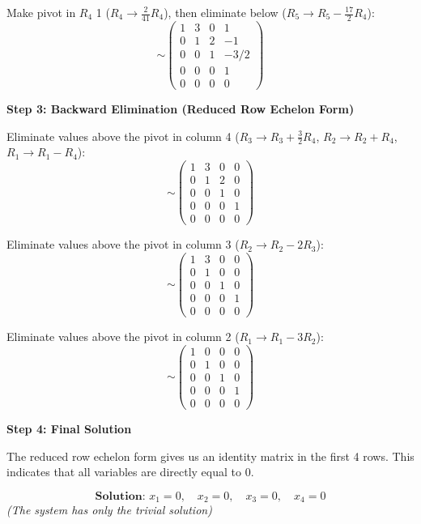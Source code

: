 \documentclass[12pt,a3paper]{article}
\begin{document}
\begin{tcolorbox}[enhanced,breakable,
  colback=cB!4,colframe=cB,boxrule=0.8pt,arc=5pt,
  title={\textbf{Answer --- Gauss-Jordan Elimination Method}},
  fonttitle=\bfseries\color{white},colbacktitle=cB]
Make pivot in $R_4$ 1 ($R_4 \to \frac{2}{41}R_4$), then eliminate below ($R_5 \to R_5 - \frac{17}{2}R_4$):
\[
\sim \begin{pmatrix}
1 & 3 & 0 & 1 \\
0 & 1 & 2 & -1 \\
0 & 0 & 1 & -3/2 \\
0 & 0 & 0 & 1 \\
0 & 0 & 0 & 0
\end{pmatrix}
\]

\medskip
\textbf{Step 3: Backward Elimination (Reduced Row Echelon Form)}

Eliminate values above the pivot in column 4 ($R_3 \to R_3 + \frac{3}{2}R_4$, $R_2 \to R_2 + R_4$, $R_1 \to R_1 - R_4$):
\[
\sim \begin{pmatrix}
1 & 3 & 0 & 0 \\
0 & 1 & 2 & 0 \\
0 & 0 & 1 & 0 \\
0 & 0 & 0 & 1 \\
0 & 0 & 0 & 0
\end{pmatrix}
\]

Eliminate values above the pivot in column 3 ($R_2 \to R_2 - 2R_3$):
\[
\sim \begin{pmatrix}
1 & 3 & 0 & 0 \\
0 & 1 & 0 & 0 \\
0 & 0 & 1 & 0 \\
0 & 0 & 0 & 1 \\
0 & 0 & 0 & 0
\end{pmatrix}
\]

Eliminate values above the pivot in column 2 ($R_1 \to R_1 - 3R_2$):
\[
\sim \begin{pmatrix}
1 & 0 & 0 & 0 \\
0 & 1 & 0 & 0 \\
0 & 0 & 1 & 0 \\
0 & 0 & 0 & 1 \\
0 & 0 & 0 & 0
\end{pmatrix}
\]

\medskip
\textbf{Step 4: Final Solution}

The reduced row echelon form gives us an identity matrix in the first 4 rows. This indicates that all variables are directly equal to 0.

\[
\boxed{\textbf{Solution: } x_1 = 0, \quad x_2 = 0, \quad x_3 = 0, \quad x_4 = 0}
\]
\textit{(The system has only the trivial solution)}

\end{tcolorbox}
\end{document}
